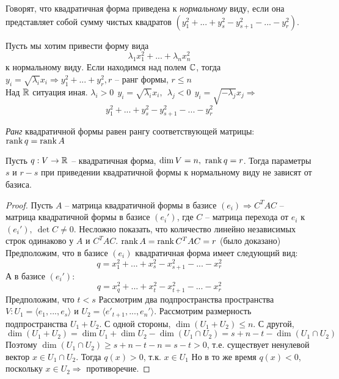 
\begin{Def}
	Говорят, что квадратичная форма приведена к \textit{нормальному}  виду, если она представляет собой сумму чистых квадратов $(y^2_1 + ... + y^2_s - y^2_{s+1} - ... - y^2_r)$. 
\end{Def} 

\begin{Rem}
	Пусть мы хотим привести форму вида
	\[\lambda_1 x_1^2 + ... + \lambda_nx_n^2\]
	к нормальному виду.
	Если находимся над полем $\mathbb{C}$, тогда $y_i = \sqrt{\lambda_i}x_i \Rightarrow y_1^2+...+y_r^2, r$ -- ранг формы, $r \leqslant n$\\
	Над $\mathbb{R}$ ситуация иная. $\lambda_i > 0 \ \ y_i = \sqrt{\lambda_i}x_i, \ \ \lambda_j < 0 \ \ y_i = \sqrt{-\lambda_j}x_j \Rightarrow$
	\[y^2_1 + ... + y^2_s - y^2_{s+1} - ... - y^2_r\]
\end{Rem}

\begin{Def}[Ранг к.ф.]
	\textit{Ранг} квадратичной формы равен рангу соответствующей матрицы: 
	$\operatorname{rank} q = \operatorname{rank} A$
\end{Def} 

\begin{Thm} 
	Пусть $q: V \to \mathbb{R}$ -- квадратичная форма, $\dim V = n, \ \operatorname{rank} q = r$.
	Тогда параметры $s$ и $r - s$ при приведении квадратичной формы к нормальному виду не зависят от базиса. 
\end{Thm} 

\begin{proof}
	Пусть $A$ -- матрица квадратичной формы в базисе $(e_i) \Rightarrow C^TAC$ -- матрица квадратичной формы в базисе $(e_i')$, где $C$ -- матрица перехода от $e_i$ к $(e_i'), \ \det C \neq 0$.
	Несложно показать, что количество линейно независимых строк одинаково у $A$ и $C^TAC$. $\operatorname{rank} A = \operatorname{rank} C^TAC = r$ (было доказано)\\
	Предположим, что в базисе $(e_i)$ квадратичная форма имеет следующий вид: 
	\[q = x_1^2 + ... + x_s^2 - x^2_{s+1} - ... - x^2_r\]
	А в базисе $(e_i')$: 
	\[q = x_q^2 + ... + x^2_t - x^2_{t+1} - ... - x^2_r\]
	Предположим, что $t<s$
	Рассмотрим два подпространства пространства $V: U_1 = \langle e_1, ..., e_s\rangle$ и $U_2 = \langle e'_{t+1}, ..., e_n'\rangle$.
	Рассмотрим размерность подпространства $U_1 + U_2$. С одной стороны, $\dim (U_1 + U_2) \leqslant n$. С другой, 
	\[\dim (U_1 + U_2) = \dim U_1 + \dim U_2 - \dim (U_1 \cap U_2) = s + n - t - \dim (U_1 \cap U_2)\] 
	Поэтому $\dim (U_1 \cap U_2) \geqslant s + n - t - n = s - t > 0$, т.е. существует ненулевой вектор $x \in U_1 \cap U_2$. Тогда $q(x) > 0$, т.к. $x \in U_1$ Но в то же время $q(x) < 0$, поскольку $x \in U_2 \Rightarrow$ противоречие.
\end{proof}

